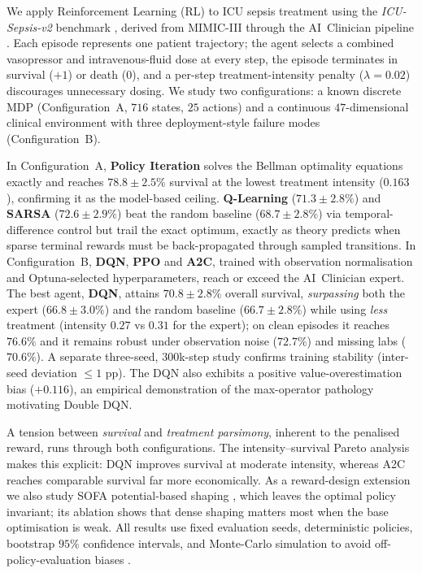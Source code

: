 \documentclass[11pt,a4paper]{article}
\begin{document}
We apply Reinforcement Learning (RL) to ICU sepsis treatment using the
\textit{ICU-Sepsis-v2} benchmark \cite{choudhary2024}, derived from MIMIC-III
through the AI~Clinician pipeline \cite{komorowski2018}. Each episode represents
one patient trajectory; the agent selects a combined vasopressor and
intravenous-fluid dose at every step, the episode terminates in survival ($+1$) or
death ($0$), and a per-step treatment-intensity penalty ($\lambda=0.02$) discourages
unnecessary dosing. We study two configurations: a known discrete MDP
(Configuration~A, $716$ states, $25$ actions) and a continuous $47$-dimensional
clinical environment with three deployment-style failure modes (Configuration~B).

In Configuration~A, \textbf{Policy Iteration} solves the Bellman optimality
equations exactly and reaches $\mathbf{78.8\pm2.5\%}$ survival at the lowest
treatment intensity ($0.163$), confirming it as the model-based ceiling.
\textbf{Q-Learning} ($71.3\pm2.8\%$) and \textbf{SARSA} ($72.6\pm2.9\%$) beat the
random baseline ($68.7\pm2.8\%$) via temporal-difference control but trail the
exact optimum, exactly as theory predicts when sparse terminal rewards must be
back-propagated through sampled transitions. In Configuration~B, \textbf{DQN},
\textbf{PPO} and \textbf{A2C}, trained with observation normalisation and
Optuna-selected hyperparameters, reach or exceed the AI~Clinician expert. The best agent, \textbf{DQN}, attains
$\mathbf{70.8\pm2.8\%}$ overall survival, \emph{surpassing} both the expert
($66.8\pm3.0\%$) and the random baseline ($66.7\pm2.8\%$) while using \emph{less}
treatment (intensity $0.27$ vs $0.31$ for the expert); on clean episodes it reaches
$76.6\%$ and it remains robust under observation noise ($72.7\%$) and missing labs
($70.6\%$). A separate three-seed, $300$k-step study confirms training stability
(inter-seed deviation $\le1$ pp). The DQN also exhibits a positive
value-overestimation bias ($+0.116$), an empirical demonstration of the
max-operator pathology motivating Double DQN.

A tension between \emph{survival} and \emph{treatment parsimony}, inherent to the
penalised reward, runs through both configurations. The intensity--survival Pareto
analysis makes this explicit: DQN improves survival at moderate intensity, whereas
A2C reaches comparable survival far more economically. As a reward-design extension we also
study SOFA potential-based shaping \cite{ng1999}, which leaves the optimal policy
invariant; its ablation shows that dense shaping matters most when the base
optimisation is weak. All results use fixed evaluation seeds, deterministic
policies, bootstrap $95\%$ confidence intervals, and Monte-Carlo simulation to
avoid off-policy-evaluation biases \cite{gottesman2019}.
\end{document}
